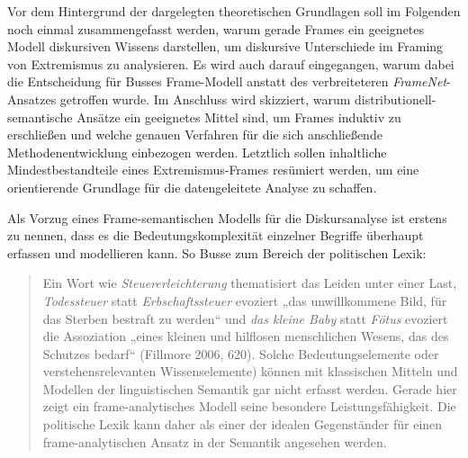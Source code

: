 Vor dem Hintergrund der dargelegten theoretischen Grundlagen soll im Folgenden noch einmal zusammengefasst werden, warum gerade Frames ein geeignetes Modell diskursiven Wissens darstellen, um diskursive Unterschiede im Framing von Extremismus zu analysieren. Es wird auch darauf eingegangen, warum dabei die Entscheidung für Busses Frame-Modell anstatt des verbreiteteren \emph{FrameNet}-Ansatzes getroffen wurde. Im Anschluss wird skizziert, warum distributionell-semantische Ansätze ein geeignetes Mittel sind, um Frames induktiv zu erschließen und welche genauen Verfahren für die sich anschließende Methodenentwicklung einbezogen werden. Letztlich sollen inhaltliche Mindestbestandteile eines Extremismus-Frames resümiert werden, um eine orientierende Grundlage für die datengeleitete Analyse zu schaffen.

Als Vorzug eines Frame-semantischen Modells für die Diskursanalyse ist erstens zu nennen, dass es die Bedeutungskomplexität einzelner Begriffe überhaupt erfassen und modellieren kann. So Busse zum Bereich der politischen Lexik:

\begin{quote}
Ein Wort wie \emph{Steuererleichterung} thematisiert das Leiden unter einer Last, \emph{Todessteuer} statt \emph{Erbschaftssteuer} evoziert „das unwillkommene Bild, für das Sterben bestraft zu werden`` und \emph{das kleine Baby} statt \emph{Fötus} evoziert die Assoziation „eines kleinen und hilflosen menschlichen Wesens, das des Schutzes bedarf`` (Fillmore 2006, 620). Solche Bedeutungselemente oder verstehensrelevanten Wissenselemente) können mit klassischen Mitteln und Modellen der linguistischen Semantik gar nicht erfasst werden. Gerade hier zeigt ein frame-analytisches Modell seine besondere Leistungsfähigkeit. Die politische Lexik kann daher als einer der idealen Gegenständer für einen frame-analytischen Ansatz in der Semantik angesehen werden. \autocite[198]{busse33LexikFrameanalytisch2017}
\end{quote}

